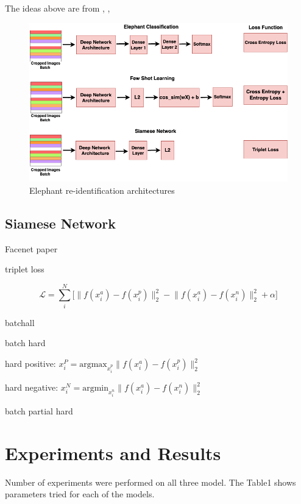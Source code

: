 \documentclass[10pt,twocolumn,letterpaper]{article}
\begin{document}
The ideas above are from \cite{fewshotlectures}, \cite{fewshotbaseline}, \cite{fewshotmetabaseline}


\begin{figure}[t]
  \centering
  \includegraphics[scale=0.275]{reidentification_network}
   \caption{Elephant re-identification architectures}
   \label{fig:reidentification_network}
\end{figure}

\subsection{Siamese Network}

Facenet paper

triplet loss

$$
\mathcal{L} = \sum_{i}^N \Big[ \lVert f(x_i^a) - f(x_i^p)\rVert_2^2 - \lVert f(x_i^a) - f(x_i^n)\rVert_2^2  + \alpha \Big]
$$

batchall

batch hard

hard positive: $x_i^P = \text{argmax}_{x_i^p}  \lVert f(x_i^a) - f(x_i^p)\rVert_2^2$

hard negative: $x_i^N = \text{argmin}_{x_i^n}  \lVert f(x_i^a) - f(x_i^n)\rVert_2^2$

batch partial hard




\section{Experiments and Results}
\label{sec:expresults}
Number of experiments were performed on all three model. The Table1 shows parameters tried for each of the models. 
\end{document}
